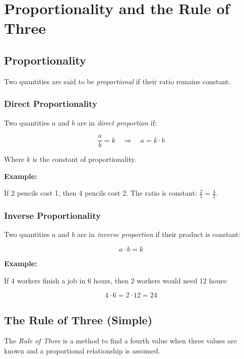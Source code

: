 \newpage
\section{Proportionality and the Rule of Three}

\subsection{Proportionality}

Two quantities are said to be \emph{proportional} if their ratio remains constant.

\subsubsection{Direct Proportionality}

Two quantities \(a\) and \(b\) are in \emph{direct proportion} if:

\[
    \frac{a}{b} = k \quad \Rightarrow \quad a = k \cdot b
\]

Where \(k\) is the constant of proportionality.
\vspace{\baselineskip}

\textbf{Example:}
\vspace{\baselineskip}
 
If 2 pencils cost 1, then 4 pencils cost 2. The ratio is constant: \(\frac{2}{1} = \frac{4}{2}\).

\subsubsection{Inverse Proportionality}

Two quantities \(a\) and \(b\) are in \emph{inverse proportion} if their product is constant:

\[
    a \cdot b = k
\]

\textbf{Example:}
\vspace{\baselineskip}

If 4 workers finish a job in 6 hours, then 2 workers would need 12 hours:

\[
    4 \cdot 6 = 2 \cdot 12 = 24
\]

\subsection{The Rule of Three (Simple)}

The \emph{Rule of Three} is a method to find a fourth value when three values are known and a proportional relationship is assumed.

